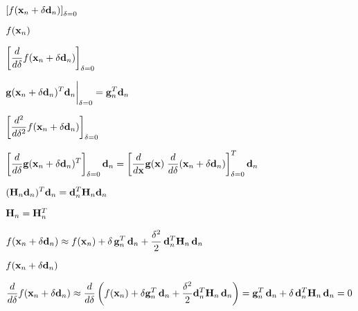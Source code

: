 \documentclass{article}
\def\lthtmlcheckvsize{\ifdim\ht\sizebox<\vsize 
  \ifdim\wd\sizebox<\hsize\expandafter\hfill\fi \expandafter\vfill
  \else\expandafter\vss\fi}%
\begin{document}
{\newpage\clearpage
{}%
$\displaystyle \left[f({\bf x}_n+\delta{\bf d}_n)\right]_{\delta=0}$%
\lthtmlindisplaymathZ
\lthtmlcheckvsize\clearpage}

{\newpage\clearpage
{}%
$\displaystyle f({\bf x}_n)$%
\lthtmlindisplaymathZ
\lthtmlcheckvsize\clearpage}

{\newpage\clearpage
{}%
$\displaystyle \left[\frac{d}{d\delta}f({\bf x}_n+\delta{\bf d}_n)\right]_{\delta=0}$%
\lthtmlindisplaymathZ
\lthtmlcheckvsize\clearpage}

{\newpage\clearpage
{}%
$\displaystyle {\bf g}({\bf x}_n+\delta{\bf d}_n)^T{\bf d}_n\bigg|_{\delta=0}
={\bf g}^T_n{\bf d}_n$%
\lthtmlindisplaymathZ
\lthtmlcheckvsize\clearpage}

{\newpage\clearpage
{}%
$\displaystyle \left[\frac{d^2}{d\delta^2}f({\bf x}_n+\delta{\bf d}_n)\right]_{\delta=0}$%
\lthtmlindisplaymathZ
\lthtmlcheckvsize\clearpage}

{\newpage\clearpage
{}%
$\displaystyle \left[\frac{d}{d\delta}{\bf g}({\bf x}_n
+\delta{\bf d}_n)^T\right]_{\delta=0}{\bf d}_n
=\left[\frac{d}{d{\bf x}} {\bf g}({\bf x})\;
\frac{d}{d\delta}({\bf x}_n+\delta{\bf d}_n)\right]^T_{\delta=0}
{\bf d}_n$%
\lthtmlindisplaymathZ
\lthtmlcheckvsize\clearpage}

{\newpage\clearpage
{}%
$\displaystyle ({\bf H}_n{\bf d}_n)^T{\bf d}_n={\bf d}^T_n{\bf H}_n{\bf d}_n$%
\lthtmlindisplaymathZ
\lthtmlcheckvsize\clearpage}

{\newpage\clearpage
{}%
$ {\bf H}_n={\bf H}_n^T$%
\lthtmlindisplaymathZ
\lthtmlcheckvsize\clearpage}

{\newpage\clearpage
{}%
$\displaystyle f({\bf x}_n+\delta{\bf d}_n)\approx
f({\bf x}_n)+\delta\,{\bf g}^T_n\,{\bf d}_n
+\frac{\delta^2}{2}\,{\bf d}^T_n{\bf H}_n\,{\bf d}_n$%
\lthtmlindisplaymathZ
\lthtmlcheckvsize\clearpage}

{\newpage\clearpage
{}%
$ f({\bf x}_n+\delta{\bf d}_n)$%
\lthtmlindisplaymathZ
\lthtmlcheckvsize\clearpage}

{\newpage\clearpage
{}%
$\displaystyle \frac{d}{d\delta}f({\bf x}_n+\delta{\bf d}_n)
\approx\frac{d}{d\delta}\left(
f({\bf x}_n)+\delta{\bf g}^T_n\,{\bf d}_n
+\frac{\delta^2}{2}{\bf d}^T_n{\bf H}_n\,{\bf d}_n \right)
={\bf g}^T_n\,{\bf d}_n+\delta\,{\bf d}^T_n{\bf H}_n\,{\bf d}_n=0$%
\lthtmlindisplaymathZ
\lthtmlcheckvsize\clearpage}
\end{document}
